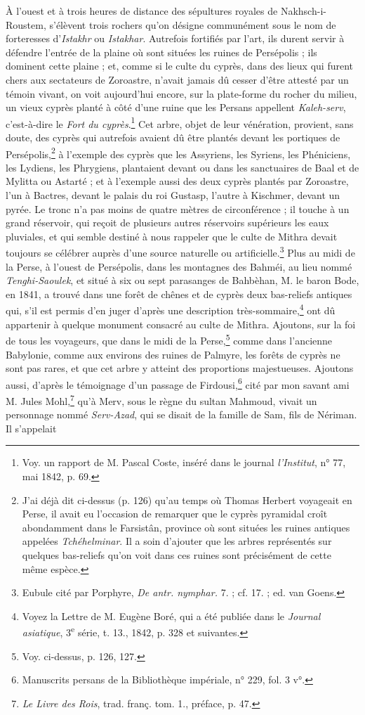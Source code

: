 \documentclass{article}
\begin{document}
À l'ouest et à trois heures de distance des sépultures royales de Nakhsch-i-Roustem, s'élèvent trois rochers qu'on désigne communément sous le nom de forteresses d'\emph{Istakhr} ou \emph{Istakhar}. Autrefois fortifiés par l'art, ils durent servir à défendre l'entrée de la plaine où sont situées les ruines de Persépolis ; ils dominent cette plaine ; et, comme si le culte du cyprès, dans des lieux qui furent chers aux sectateurs de Zoroastre, n'avait jamais dû cesser d'être attesté par un témoin vivant, on voit aujourd'hui encore, sur la plate-forme du rocher du milieu, un vieux cyprès planté à côté d'une ruine que les Persans appellent \emph{Kaleh-serv}, c'est-à-dire le \emph{Fort du cyprès}.\footnote{Voy. un rapport de M. Pascal Coste, inséré dans le journal \emph{l'Institut}, n° 77, mai 1842, p. 69.} Cet arbre, objet de leur vénération, provient, sans doute, des cyprès qui autrefois avaient dû être plantés devant les portiques de Persépolis,\footnote{J'ai déjà dit ci-dessus (p. 126) qu'au temps où Thomas Herbert voyageait en Perse, il avait eu l'occasion de remarquer que le cyprès pyramidal croît abondamment dans le Farsistân, province où sont situées les ruines antiques appelées \emph{Tchéhelminar}. Il a soin d'ajouter que les arbres représentés sur quelques bas-reliefs qu'on voit dans ces ruines sont précisément de cette même espèce.} à l'exemple des cyprès que les Assyriens, les Syriens, les Phéniciens, les Lydiens, les Phrygiens, plantaient devant ou dans les sanctuaires de Baal et de Mylitta ou Astarté ; et à l'exemple aussi des deux cyprès plantés par Zoroastre, l'un à Bactres, devant le palais du roi Gustasp, l'autre à Kischmer, devant un pyrée. Le tronc n'a pas moins de quatre mètres de circonférence ; il touche à un grand réservoir, qui reçoit de plusieurs autres réservoirs supérieurs les eaux pluviales, et qui semble destiné à nous rappeler que le culte de Mithra devait toujours se célébrer auprès d'une source naturelle ou artificielle.\footnote{Eubule cité par Porphyre, \emph{De antr. nymphar.} 7. ; cf. 17. ; ed. van Goens.} Plus au midi de la Perse, à l'ouest de Persépolis, dans les montagnes des Bahméi, au lieu nommé \emph{Tenghi-Saoulek}, et situé à six ou sept parasanges de Bahbèhan, M. le baron Bode, en 1841, a trouvé dans une forêt de chênes et de cyprès deux bas-reliefs antiques qui, s'il est permis d'en juger d'après une description très-sommaire,\footnote{Voyez la Lettre de M. Eugène Boré, qui a été publiée dans le \emph{Journal asiatique}, 3\textsuperscript{e} série, t. 13., 1842, p. 328 et suivantes.} ont dû appartenir à quelque monument consacré au culte de Mithra. Ajoutons, sur la foi de tous les voyageurs, que dans le midi de la Perse,\footnote{Voy. ci-dessus, p. 126, 127.} comme dans l'ancienne Babylonie, comme aux environs des ruines de Palmyre, les forêts de cyprès ne sont pas rares, et que cet arbre y atteint des proportions majestueuses. Ajoutons aussi, d'après le témoignage d'un passage de Firdousi,\footnote{Manuscrits persans de la Bibliothèque impériale, n° 229, fol. 3 v°.} cité par mon savant ami M. Jules Mohl,\footnote{\emph{Le Livre des Rois}, trad. franç. tom. 1., préface, p. 47.} qu'à Merv, sous le règne du sultan Mahmoud, vivait un personnage nommé \emph{Serv-Azad}, qui se disait de la famille de Sam, fils de Nériman. Il s'appelait 
\end{document}

